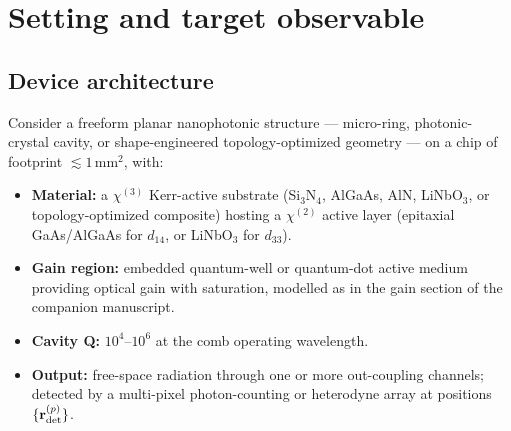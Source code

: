\documentclass[11pt]{article}
\begin{document}
\begin{abstract}
We also work out the complementary non-Gaussian
photon-blockade-comb regime (Sec.~\ref{sec:blockade}) as a novel
ultra-compact inertial-sensor operating point, providing four
Keldysh-native non-perturbative numerical routes: super-operator exact
diagonalisation, quantum-trajectory MCWF (with pathwise-differentiable
gradients via common random numbers), full counting statistics via
tilted Liouvillian (which gives the TopOpt adjoint-style gradient
without constructing $\rho_{\rm ss}$ in full), and tensor-network
MPO methods for larger arrays.  We benchmark all three on a 3-site
blockade ring with Sagnac Peierls phase, including analytical
hard-core-Keldysh Bloch bands $E_k=-2J\cos(2\pi k/N+\Phi/N)$
matching numerical diagonalisation to $10^{-15}$.
\end{abstract}

\tableofcontents

\section{Setting and target observable}
\label{sec:setup}

\subsection{Device architecture}

Consider a freeform planar nanophotonic structure --- micro-ring,
photonic-crystal cavity, or shape-engineered topology-optimized
geometry --- on a chip of footprint $\lesssim 1\,\mathrm{mm}^2$, with:
\begin{itemize}\itemsep0em
\item \textbf{Material:} a $\chi^{(3)}$ Kerr-active substrate
  (Si$_3$N$_4$, AlGaAs, AlN, LiNbO$_3$, or topology-optimized
  composite) hosting a $\chi^{(2)}$ active layer (epitaxial GaAs/AlGaAs
  for $d_{14}$, or LiNbO$_3$ for $d_{33}$).
\item \textbf{Gain region:} embedded quantum-well or quantum-dot
  active medium providing optical gain with saturation, modelled as in
  the gain section of the companion manuscript.
\item \textbf{Cavity Q:} $10^4$--$10^6$ at the comb operating
  wavelength.
\item \textbf{Output:} free-space radiation through one or more
  out-coupling channels; detected by a multi-pixel photon-counting or
  heterodyne array at positions $\{\mathbf{r}_{\rm det}^{(p)}\}$.
\end{itemize}
\end{document}
